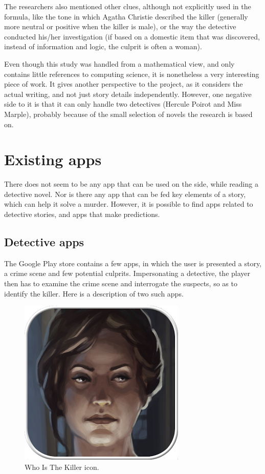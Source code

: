 \documentclass{mproj}
\begin{document}
The researchers also mentioned other clues, although not explicitly used in the formula, like the tone in which Agatha Christie described the killer (generally more neutral or positive when the killer is male), or the way the detective conducted his/her investigation (if based on a domestic item that was discovered, instead of information and logic, the culprit is often a woman).  \par

Even though this study was handled from a mathematical view, and only contains little references to computing science, it is nonetheless a very interesting piece of work. It gives another perspective to the project, as it considers the actual writing, and not just story details independently. However, one negative side to it is that it can only handle two detectives (Hercule Poirot and Miss Marple), probably because of the small selection of novels the research is based on.

\section{Existing apps}

There does not seem to be any app that can be used on the side, while reading a detective novel. Nor is there any app that can be fed key elements of a story, which can help it solve a murder. However, it is possible to find apps related to detective stories, and apps that make predictions.

\subsection*{Detective apps}

The Google Play store contains a few apps, in which the user is presented a story, a crime scene and few potential culprits. Impersonating a detective, the player then has to examine the crime scene and interrogate the suspects, so as to identify the killer. Here is a description of two such apps. \par

\begin{figure}
	\vspace{-10pt}
	\centering
	\includegraphics[scale=0.25]{images/whoisthekiller_icon}
	\caption{Who Is The Killer icon.}
	\vspace{-25pt}
\end{figure}
\end{document}
